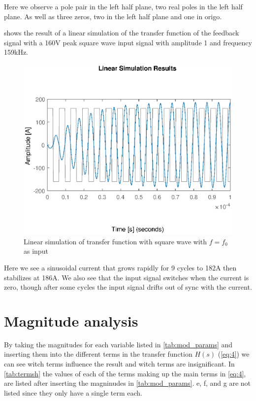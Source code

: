 Here we observe a pole pair in the left half plane, two real poles in the left half plane. As well as three zeros, two in the left half plane and one in origo.

 shows the result of a linear simulation of the transfer function of the feedback signal with a 160V peak square wave input signal with amplitude 1 and frequency 159kHz.

\begin{figure}[H]
    \centering
    \includegraphics[width=\textwidth]{img/FeedBackSimulation.eps}
    \caption{Linear simulation of transfer function with square wave with $f=f_0$ as input}
    \label{fig:fblinsim}
\end{figure}

Here we see a sinusoidal current that grows rapidly for 9 cycles to 182A then stabilizes at 186A. We also see that the input signal switches when the current is zero, though after some cycles the input signal drifts out of sync with the current.

\newpage
\section{Magnitude analysis}
By taking the magnitudes for each variable listed in \cref{tab:mod_params} and inserting them into the different terms in the transfer function $H(s)$ (\cref{eq:4}) we can see witch terms influence the result and witch terms are insignificant. In \cref{tab:termsh} the values of each of the terms making up the main terms in \cref{eq:4}, are listed after inserting the magninudes in \cref{tab:mod_params}. e, f, and g are not listed since they only have a single term each.

